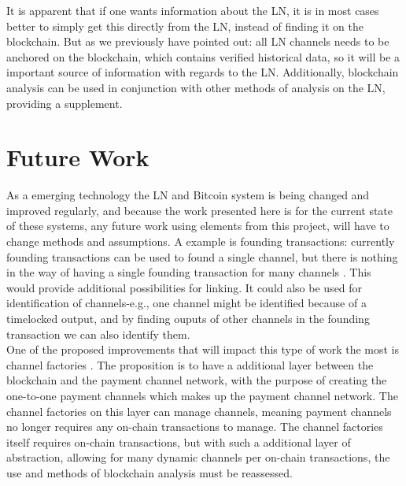 It is apparent that if one wants information about the LN, it is in most cases better to simply get this directly from the LN, instead of finding it on the blockchain.
But as we previously have pointed out: all LN channels needs to be anchored on the blockchain, which contains verified historical data, so it will be a important source of information with regards to the LN. 
Additionally, blockchain analysis can be used in conjunction with other methods of analysis on the LN, providing a supplement. 

\section{Future Work}
\label{sec:future}

As a emerging technology the LN and Bitcoin system is being changed and improved regularly, and because the work presented here is for the current state of these systems, any future work using elements from this project, will have to change methods and assumptions.
A example is founding transactions: currently founding transactions can be used to found a single channel, but there is nothing in the way of having a single founding transaction for many channels \cite{multi_channel_founding}.
This would provide additional possibilities for linking.
It could also be used for identification of channels-e.g., one channel might be identified because of a timelocked output, and by finding ouputs of other channels in the founding transaction we can also identify them.
\\

One of the proposed improvements that will impact this type of work the most is channel factories \cite{burchert2017scalable}.
The proposition is to have a additional layer between the blockchain and the payment channel network, with the purpose of creating the one-to-one payment channels which makes up the payment channel network.
The channel factories on this layer can manage channels, meaning payment channels no longer requires any on-chain transactions to manage.
The channel factories itself requires on-chain transactions, but with such a additional layer of abstraction, allowing for many dynamic channels per on-chain transactions, the use and methods of blockchain analysis must be reassessed.
\\

